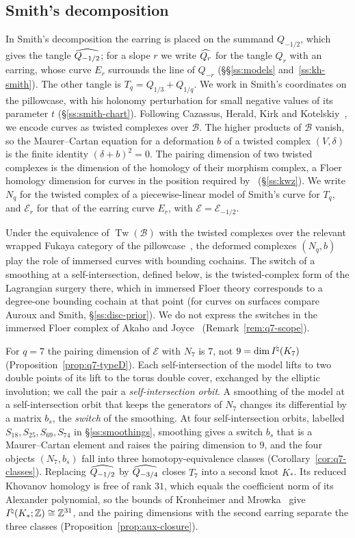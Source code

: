 \subsection{Smith's decomposition}
In Smith's decomposition the earring is placed on the summand $Q_{-1/2}$, which gives the tangle
$\widehat{Q_{-1/2}}$; for a slope $r$ we write $\widehat{Q_{r}}$ for the tangle $Q_r$ with an earring, whose curve $E_r$
surrounds the line of $Q_{-r}$ (\S\S\ref{ss:models} and~\ref{ss:kh-smith}). The other tangle is
$T_q=Q_{1/3}+Q_{1/q}$. We work in Smith's coordinates on the pillowcase, with his holonomy perturbation
for small negative values of its parameter $t$ (\S\ref{ss:smith-chart}). Following Cazassus, Herald, Kirk
and Kotelskiy~\cite[\S11]{CHKK}, we encode curves as twisted complexes over $\mathcal B$. The higher
products of $\mathcal B$ vanish, so the Maurer--Cartan equation for a deformation $b$ of a twisted complex
$(V,\delta)$ is the finite identity $(\delta+b)^2=0$. The pairing dimension of two twisted complexes is the
dimension of the homology of their morphism complex, a Floer homology dimension for curves in the position
required by~\cite[Thm.~5.22]{KWZ} (\S\ref{ss:kwz}). We write $N_q$ for the twisted complex of a
piecewise-linear model of Smith's curve for $T_q$, and $\mathcal E_r$ for that of the earring curve $E_r$,
with $\mathcal E=\mathcal E_{-1/2}$.

Under the equivalence of $\operatorname{Tw}(\mathcal B)$ with the twisted complexes over the relevant
wrapped Fukaya category of the pillowcase~\cite[\S11.5]{CHKK}, the deformed complexes $(N_q,b)$ play the role
of immersed curves with bounding cochains. The switch of a smoothing at a self-intersection, defined below,
is the twisted-complex form of the Lagrangian surgery there, which in immersed Floer theory corresponds to a degree-one bounding cochain at that point (for curves on surfaces compare Auroux and Smith, \S\ref{ss:disc-prior}). We do not express the switches in the immersed Floer complex
of Akaho and Joyce~\cite{AkahoJoyce} (Remark~\ref{rem:q7-scope}).

For $q=7$ the pairing dimension of $\mathcal E$ with $N_7$ is $7$, not $9=\dim I^{\natural}(K_7)$
(Proposition~\ref{prop:q7-typeD}). Each self-intersection of the model lifts to two double points of its lift to the torus double cover, exchanged by the elliptic involution; we call the pair a \emph{self-intersection orbit}. A smoothing of the
model at a self-intersection orbit that keeps the generators of $N_7$ changes its differential by a matrix
$b_s$, the \emph{switch} of the smoothing. At four self-intersection orbits, labelled
$S_{18},S_{25},S_{69},S_{74}$ in \S\ref{ss:smoothings}, smoothing gives a switch $b_s$ that is a
Maurer--Cartan element and raises the pairing dimension to $9$, and the four objects $(N_7,b_s)$ fall into
three homotopy-equivalence classes (Corollary~\ref{cor:q7-classes}). Replacing $\widehat{Q_{-1/2}}$ by $\widehat{Q_{-3/4}}$
closes $T_7$ into a second knot $K_*$. Its reduced Khovanov homology is free of rank $31$, which equals the
coefficient norm of its Alexander polynomial, so the bounds of Kronheimer and Mrowka~\cite{KMAlex,KM2} give
$I^{\natural}(K_*;\mathbb{Z})\cong\mathbb{Z}^{31}$, and the pairing dimensions with the second earring separate the three classes
(Proposition~\ref{prop:aux-closure}).

